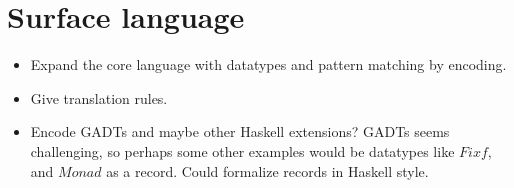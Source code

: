 \section{Surface language}


\begin{itemize}
\item Expand the core language with datatypes and pattern matching by encoding.
\item Give translation rules.
\item Encode GADTs and maybe other Haskell extensions? GADTs seems challenging, so perhaps some other examples would be datatypes like $Fix f$, and $Monad$ as a record. Could formalize records in Haskell style.  
\end{itemize}
